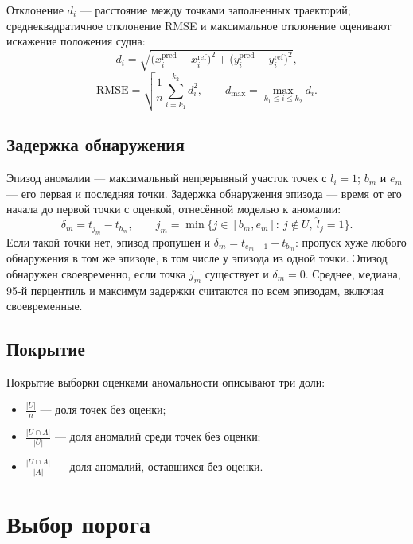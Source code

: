 \documentclass[a4paper,12pt]{report}
\begin{document}
	Отклонение $d_i$ --- расстояние между точками заполненных траекторий; среднеквадратичное отклонение RMSE и максимальное отклонение оценивают искажение положения судна:
	\[
		d_i=\sqrt{\bigl(x^{\mathrm{pred}}_i-x^{\mathrm{ref}}_i\bigr)^2+\bigl(y^{\mathrm{pred}}_i-y^{\mathrm{ref}}_i\bigr)^2},
	\]
	\[
		\mathrm{RMSE}=\sqrt{\frac{1}{n}\sum_{i=k_1}^{k_2}d_i^2},\qquad
		d_{\max}=\max_{k_1\le i\le k_2} d_i.
	\]

	\subsection{Задержка обнаружения}

	Эпизод аномалии --- максимальный непрерывный участок точек с $l_i=1$; $b_m$ и $e_m$ --- его первая и последняя точки.
	Задержка обнаружения эпизода --- время от его начала до первой точки с оценкой, отнесённой моделью к аномалии:
	\[
		\delta_m=t_{j_m}-t_{b_m},\qquad j_m=\min\{j\in[b_m,e_m]:\ j\notin U,\ \hat l_j=1\}.
	\]
	Если такой точки нет, эпизод пропущен и $\delta_m=t_{e_m+1}-t_{b_m}$: пропуск хуже любого обнаружения в том же эпизоде, в том числе у эпизода из одной точки.
	Эпизод обнаружен своевременно, если точка $j_m$ существует и $\delta_m=0$.
	Среднее, медиана, 95-й перцентиль и максимум задержки считаются по всем эпизодам, включая своевременные.

	\subsection{Покрытие}

	Покрытие выборки оценками аномальности описывают три доли:
	\begin{itemize}
		\item $\frac{|U|}{n}$ --- доля точек без оценки;
		\item $\frac{|U\cap A|}{|U|}$ --- доля аномалий среди точек без оценки;
		\item $\frac{|U\cap A|}{|A|}$ --- доля аномалий, оставшихся без оценки.
	\end{itemize}

	\section{Выбор порога}
\end{document}
